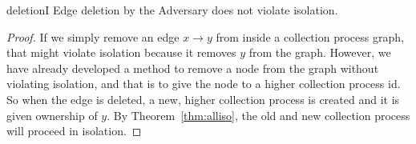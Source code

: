 \begin{replemma}{deletionI}
Edge deletion by the Adversary does not violate isolation.
\end{replemma}
\begin{proof}
If we simply remove an edge $x\rightarrow y$ from inside a collection process
graph, that might violate isolation because it removes $y$ from the graph.
However, we have already developed a method to remove a node from the graph
without violating isolation, and that is to give the node to a higher
collection process id. So when the edge is deleted, a new, higher collection
process is created and it is given ownership of $y$. By
Theorem~\ref{thm:alliso}, the old and new collection process will proceed in
isolation.
%
\end{proof}

